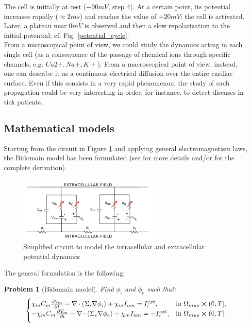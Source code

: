\documentclass[a4paper,11pt]{article}
\newtheorem{problem}{Problem}
\begin{document}
    \noindent The cell is initially at rest ($-90mV$, step 4). At a certain point, its potential increases rapidly ($\approx2ms$) and reaches the value of $+20mV$: the cell is activated. Later, a plateau near $0mV$ is observed and then a slow repolarization to the initial potential; cf. Fig. \ref{potential_cycle}. \\
    From a microscopical point of view, we could study the dynamics acting in each single cell (as a consequence of the passage of chemical ions through specific channels, e.g. $Ca2+,Na+,K+$). From a macroscopical point of view, instead, one can describe it as a continuous electrical diffusion over the entire cardiac surface. Even if this consists in a very rapid phenomenon, the study of such propagation could be very interesting in order, for instance, to detect diseases in sick patients.
    
    \subsection{Mathematical models}
    Starting from the circuit in Figure \ref{electrical_circuit} and applying general electromagnetism laws, the Bidomain model has been formulated (see \parencite{acta} for more details and/or \parencite{colli_franzone} for the complete derivation).
    
    \begin{figure}[h]
    	\begin{center}
    		\includegraphics[width = 7cm]{./electrical_circuit.png}
    		\caption{Simplified circuit to model the intracellular and extracellular potential dynamics}
    		\label{electrical_circuit}
    	\end{center}
    \end{figure}
    
    \noindent The general formulation is the following: \vspace{3mm}
    \begin{problem}[Bidomain model]
    Find $\phi_i$ and $\phi_e$ such that:
	\begin{equation*}
	\begin{cases}
	\chi_m C_m\pdv{V_m}{t} - \nabla \cdot (\Sigma_i \nabla \phi_i) + \chi_m I_{ion} = I_i^{ext},    & \text{in } \Omega_{mus} \cross (0,T],
	\\
	\vspace{2mm}
	-\chi_m C_m\pdv{V_m}{t} - \nabla \cdot (\Sigma_e \nabla \phi_e) - \chi_m I_{ion} = -I_e^{ext},    & \text{in } \Omega_{mus} \cross (0,T].
	\end{cases}
	\end{equation*}
	\end{problem}
	\vspace{3mm}
	
\end{document}
